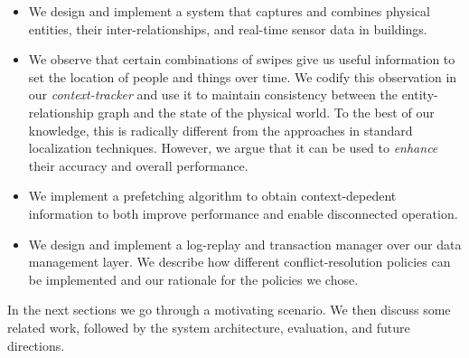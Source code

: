 \begin{itemize}
\item We design and implement a system that captures and combines physical entities, their inter-relationships, and real-time sensor data 
		in buildings.%
\item We observe that certain combinations of swipes give us useful information to set the location of people and things over time.
		We codify this observation in our \emph{context-tracker} and use it to maintain consistency between the entity-relationship graph and the 
		state of the physical world.  To the best of our knowledge, this is radically different from the approaches in standard 
		localization techniques.  However, we argue that it can be used to \emph{enhance} their accuracy and overall performance.
\item We implement a prefetching algorithm to obtain context-depedent information to both improve performance and
		enable disconnected operation.
\item We design and implement a log-replay and transaction manager over our data management layer.  We describe how different 
		conflict-resolution policies can be implemented and our rationale for the policies we chose.
\end{itemize}

\vspace{0.08in}

In the next sections we go through a motivating scenario.  We then discuss some related work, followed 
by the system architecture, evaluation, and future directions.


